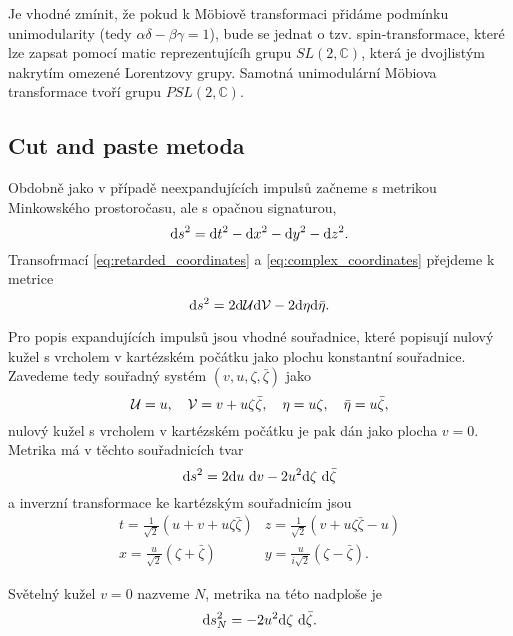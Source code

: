 Je vhodné zmínit, že pokud k Möbiově transformaci přidáme podmínku unimodularity (tedy $\alpha \delta - \beta \gamma = 1$),
bude se jednat o tzv. spin-transformace, které lze zapsat pomocí matic reprezentujícíh grupu $SL(2,\mathbb{C})$, která je dvojlistým nakrytím
omezené Lorentzovy grupy. Samotná unimodulární Möbiova transformace tvoří grupu $PSL(2, \mathbb{C})$.

\subsection{Cut and paste metoda}
Obdobně jako v případě neexpandujících impulsů začneme s metrikou Minkowského prostoročasu, ale s opačnou signaturou,
\begin{equation}
    \mathrm{d} s^2 = \mathrm{d} t^2 - \mathrm{d} x^2 - \mathrm{d} y^2 - \mathrm{d} z^2.
\end{equation}
Transofrmací \eqref{eq:retarded_coordinates} a \eqref{eq:complex_coordinates} přejdeme
k metrice
\begin{equation}
    \mathrm{d} s^2 = 2 \mathrm{d} \mathcal{U} \mathrm{d} \mathcal{V} - 2 \mathrm{d} \eta \mathrm{d} \bar{\eta}.
\end{equation}

Pro popis expandujících impulsů jsou vhodné souřadnice, které popisují nulový kužel s
vrcholem v kartézském počátku jako plochu konstantní souřadnice. Zavedeme tedy
souřadný systém $(v, u, \zeta, \bar{\zeta})$ jako
\begin{equation}
    \label{eq:expanding_null_tetrad}
    \mathcal{U} = u,~~~ \mathcal{V} = v + u \zeta \bar{\zeta}, ~~~ \eta = u \zeta, ~~~ \bar{\eta} = u \bar{\zeta},
\end{equation}
nulový kužel s vrcholem v kartézském počátku je pak dán jako plocha $v=0$. Metrika má v těchto souřadnicích tvar
\begin{equation}
    \mathrm{d} s^2 = 2 \mathrm{d} u ~ \mathrm{d} v - 2 u^2 \mathrm{d} \zeta ~ \mathrm{d} \bar{\zeta}
\end{equation}
a inverzní transformace ke kartézským souřadnicím jsou
\begin{align}
    t = \frac{1}{\sqrt{2}} \left(u + v + u \zeta \bar{\zeta}\right) & z = \frac{1}{\sqrt{2}} \left(v + u \zeta \bar{\zeta} - u\right) \\
    x = \frac{u}{\sqrt{2}} (\zeta + \bar{\zeta}) & y = \frac{u}{i \sqrt{2}} (\zeta - \bar{\zeta}).
\end{align}

Světelný kužel $v=0$ nazveme $N$, metrika na této nadploše je
\begin{equation}
    \label{eq:null_cone_metric}
    \mathrm{d} s_N^2 = -2 u^2 \mathrm{d} \zeta ~ \mathrm{d} \bar{\zeta}.
\end{equation}

